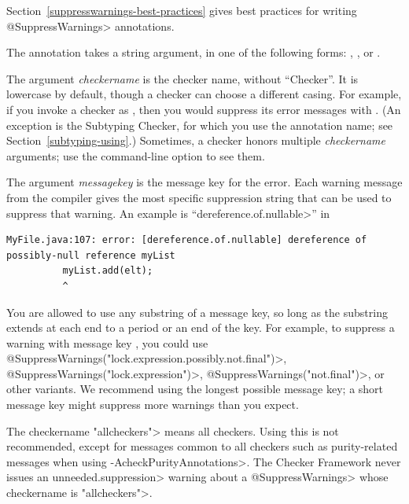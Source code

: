 Section~\ref{suppresswarnings-best-practices} gives best practices for
writing \<@SuppressWarnings> annotations.



The  annotation takes a string argument, in one of
the following forms:
,
,
or
.

The argument \emph{checkername} is the checker name, without ``Checker''.
It is lowercase by default, though a checker can choose a different casing.
For
example, if you invoke a checker as
,
then you would suppress its error messages with
.  (An exception is the Subtyping
Checker, for which you use the annotation name; see
Section~\ref{subtyping-using}.)
Sometimes, a checker honors multiple \emph{checkername} arguments; use
the  command-line option to see them.

The argument \emph{messagekey} is the message key for the error.
Each warning message from the compiler gives the most specific
suppression string that can be used to suppress that warning.
An example is ``\<dereference.of.nullable>'' in

\begin{smaller}
\begin{Verbatim}
MyFile.java:107: error: [dereference.of.nullable] dereference of possibly-null reference myList
          myList.add(elt);
          ^
\end{Verbatim}
\end{smaller}

\noindent
You are allowed to use any substring of a message key, so long as the
substring extends at each end to a period or an end of the key.  For
example, to suppress a warning with message key
, you could use
\<@SuppressWarnings("lock.expression.possibly.not.final")>,
\<@SuppressWarnings("lock.expression")>,
\<@SuppressWarnings("not.final")>, or other variants.
We recommend using
the longest possible message key; a short message key might suppress more
warnings than you expect.

The checkername \<"allcheckers"> means all checkers.  Using this is not
recommended, except for messages common to all checkers such as
purity-related messages when using \<-AcheckPurityAnnotations>.
The Checker Framework never issues an \<unneeded.suppression> warning
about a \<@SuppressWarnings> whose checkername is \<"allcheckers">.

